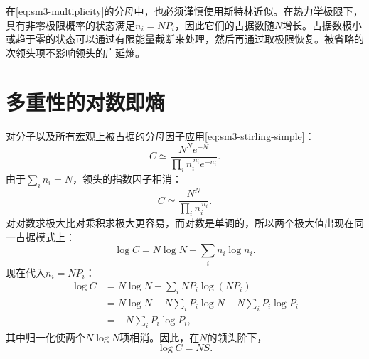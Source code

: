 \begin{classroomqa}
\end{classroomqa}

\begin{classroomqa}
\end{classroomqa}

在\eqref{eq:sm3-multiplicity}的分母中，也必须谨慎使用斯特林近似。在热力学极限下，具有非零极限概率的状态满足\(n_i=NP_i\)，因此它们的占据数随\(N\)增长。占据数极小或趋于零的状态可以通过有限能量截断来处理，然后再通过取极限恢复。被省略的次领头项不影响领头的广延熵。

\section{多重性的对数即熵}

对分子以及所有宏观上被占据的分母因子应用\eqref{eq:sm3-stirling-simple}：
\begin{equation}
 C\simeq
 \frac{N^Ne^{-N}}
 {\prod_i n_i^{\,n_i}e^{-n_i}}.
 \label{eq:sm3-c-stirling}
\end{equation}
由于\(\sum_i n_i=N\)，领头的指数因子相消：
\begin{equation}
 C\simeq\frac{N^N}{\prod_i n_i^{\,n_i}}.
 \label{eq:sm3-c-leading}
\end{equation}
对对数求极大比对乘积求极大更容易，而对数是单调的，所以两个极大值出现在同一占据模式上：
\begin{equation}
 \log C=N\log N-\sum_i n_i\log n_i.
 \label{eq:sm3-logc-occupations}
\end{equation}
现在代入\(n_i=NP_i\)：
\begin{align}
 \log C
 &=N\log N-\sum_iNP_i\log(NP_i)\\
 &=N\log N-N\sum_iP_i\log N
   -N\sum_iP_i\log P_i\\
 &=-N\sum_iP_i\log P_i,
 \label{eq:sm3-logc-entropy-derivation}
\end{align}
其中归一化使两个\(N\log N\)项相消。因此，在\(N\)的领头阶下，
\begin{equation}
 \boxed{\log C=NS}.
 \label{eq:sm3-logc-ns}
\end{equation}

